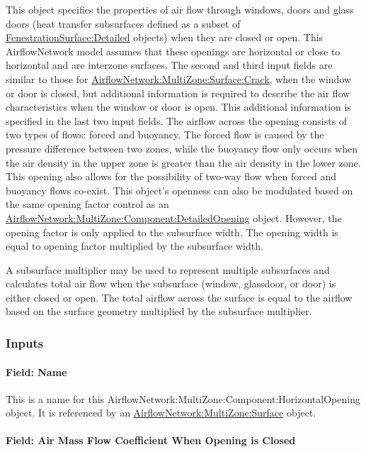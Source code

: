 This object specifies the properties of air flow through windows, doors and glass doors (heat transfer subsurfaces defined as a subset of \hyperref[fenestrationsurfacedetailed]{FenestrationSurface:Detailed} objects) when they are closed or open. This AirflowNetwork model assumes that these openings are horizontal or close to horizontal and are interzone surfaces. The second and third input fields are similar to those for \hyperref[airflownetworkmultizonesurfacecrack]{AirflowNetwork:MultiZone:Surface:Crack}, when the window or door is closed, but additional information is required to describe the air flow characteristics when the window or door is open. This additional information is specified in the last two input fields. The airflow across the opening consists of two types of flows: forced and buoyancy. The forced flow is caused by the pressure difference between two zones, while the buoyancy flow only occurs when the air density in the upper zone is greater than the air density in the lower zone. This opening also allows for the possibility of two-way flow when forced and buoyancy flows co-exist. This object's openness can also be modulated based on the same opening factor control as an \hyperref[airflownetworkmultizonecomponentdetailedopening]{AirflowNetwork:MultiZone:Component:DetailedOpening} object. However, the opening factor is only applied to the subsurface width. The opening width is equal to opening factor multiplied by the subsurface width.

A subsurface multiplier may be used to represent multiple subsurfaces and calculates total air flow when the subsurface (window, glassdoor, or door) is either closed or open. The total airflow across the surface is equal to the airflow based on the surface geometry multiplied by the subsurface multiplier.

\subsubsection{Inputs}\label{inputs-5-003}

\paragraph{Field: Name}\label{field-name-5-003}

This is a name for this AirflowNetwork:MultiZone:Component:HorizontalOpening object. It is referenced by an \hyperref[airflownetworkmultizonesurface]{AirflowNetwork:MultiZone:Surface} object.

\paragraph{Field: Air Mass Flow Coefficient When Opening is Closed}\label{field-air-mass-flow-coefficient-when-opening-is-closed-1}

